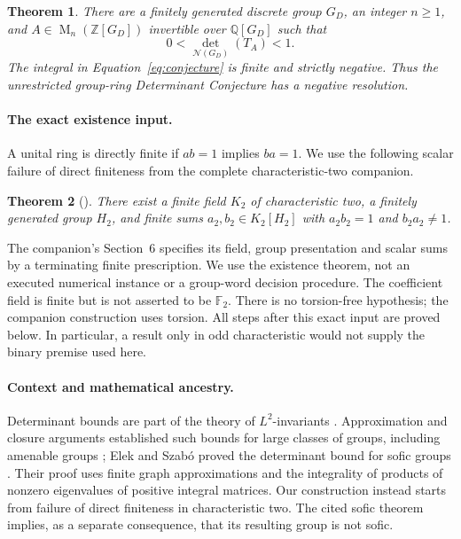 \documentclass[11pt]{article}
\newtheorem{theorem}{Theorem}[section]
\theoremstyle{remark}
\numberwithin{equation}{section}
\newcommand{\F}{\mathbb F}
\newcommand{\Z}{\mathbb Z}
\newcommand{\Q}{\mathbb Q}
\newcommand{\Mat}{\operatorname{M}}
\newcommand{\N}{\mathcal N}
\begin{document}
\begin{theorem}\label{thm:main}
There are a finitely generated discrete group $G_D$, an integer
$n\ge1$, and $A\in\Mat_n(\Z[G_D])$ invertible over $\Q[G_D]$ such
that
\[
 0<\det_{\N(G_D)}(T_A)<1.
\]
The integral in Equation~\eqref{eq:conjecture} is finite and strictly
negative. Thus the unrestricted group-ring Determinant Conjecture
has a negative resolution.
\end{theorem}

\paragraph{The exact existence input.}
A unital ring is directly finite if $ab=1$ implies $ba=1$.
We use the following scalar failure of direct finiteness from the
complete characteristic-two companion.

\begin{theorem}[{\cite[Theorem 1.1]{CharacteristicTwo}}]
\label{thm:input}
There exist a finite field $K_2$ of characteristic two, a finitely
generated group $H_2$, and finite sums $a_2,b_2\in K_2[H_2]$ with
$a_2b_2=1$ and $b_2a_2\ne1$.
\end{theorem}

The companion's Section~6 specifies its field, group presentation
and scalar sums by a terminating finite prescription. We use the
existence theorem, not an executed numerical instance or a
group-word decision procedure. The coefficient field is finite but
is not asserted to be $\F_2$. There is no torsion-free hypothesis;
the companion construction uses torsion. All steps after this exact
input are proved below. In particular, a result only in odd
characteristic would not supply the binary premise used here.

\paragraph{Context and mathematical ancestry.}
Determinant bounds are part of the theory of $L^2$-invariants
\cite{Luck2002}. Approximation and closure arguments established
such bounds for large classes of groups, including amenable groups
\cite[Theorem 1.21, with its erratum]{Schick2001}; Elek and Szab\'o proved the
determinant bound for sofic groups
\cite[Theorem 5]{ElekSzabo2005}. Their proof uses finite graph
approximations and the integrality of products of nonzero eigenvalues
of positive integral matrices. Our construction instead starts from
failure of direct finiteness in characteristic two. The cited sofic theorem implies, as a
separate consequence, that its resulting group is not sofic.
\end{document}
